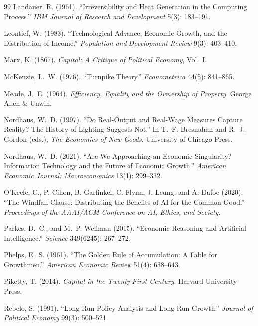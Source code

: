 \documentclass[11pt]{article}
\begin{document}
\begin{thebibliography}{99}
Landauer, R. (1961). ``Irreversibility and Heat Generation in the Computing Process.'' \emph{IBM Journal of Research and Development} 5(3): 183--191.

Leontief, W. (1983). ``Technological Advance, Economic Growth, and the Distribution of Income.'' \emph{Population and Development Review} 9(3): 403--410.

Marx, K. (1867). \emph{Capital: A Critique of Political Economy}, Vol.~I.

McKenzie, L.~W. (1976). ``Turnpike Theory.'' \emph{Econometrica} 44(5): 841--865.

Meade, J.~E. (1964). \emph{Efficiency, Equality and the Ownership of Property}. George Allen \& Unwin.

Nordhaus, W.~D. (1997). ``Do Real-Output and Real-Wage Measures Capture Reality? The History of Lighting Suggests Not.'' In T.~F. Bresnahan and R.~J. Gordon (eds.), \emph{The Economics of New Goods}. University of Chicago Press.

Nordhaus, W.~D. (2021). ``Are We Approaching an Economic Singularity? Information Technology and the Future of Economic Growth.'' \emph{American Economic Journal: Macroeconomics} 13(1): 299--332.

O'Keefe, C., P. Cihon, B. Garfinkel, C. Flynn, J. Leung, and A. Dafoe (2020). ``The Windfall Clause: Distributing the Benefits of AI for the Common Good.'' \emph{Proceedings of the AAAI/ACM Conference on AI, Ethics, and Society}.

Parkes, D.~C., and M.~P. Wellman (2015). ``Economic Reasoning and Artificial Intelligence.'' \emph{Science} 349(6245): 267--272.

Phelps, E.~S. (1961). ``The Golden Rule of Accumulation: A Fable for Growthmen.'' \emph{American Economic Review} 51(4): 638--643.

Piketty, T. (2014). \emph{Capital in the Twenty-First Century}. Harvard University Press.

Rebelo, S. (1991). ``Long-Run Policy Analysis and Long-Run Growth.'' \emph{Journal of Political Economy} 99(3): 500--521.


\end{thebibliography}
\end{document}
